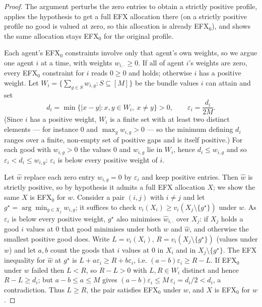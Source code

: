 \documentclass[11pt,a4paper]{article}
\theoremstyle{definition}
\theoremstyle{plain}
\newcommand{\EFX}{\textsf{EFX}}
\newcommand{\goods}{M}
\begin{document}
\begin{proof}
The argument perturbs the zero entries to obtain a strictly positive profile,
applies the hypothesis to get a full \EFX{} allocation there (on a strictly
positive profile no good is valued at zero, so this allocation is already
\EFX$_0$), and shows the same allocation stays \EFX$_0$ for the original profile.

Each agent's \EFX$_0$ constraints involve only that agent's own weights, so we
argue one agent $i$ at a time, with weights $w_{i,\cdot}\ge 0$. If all of agent
$i$'s weights are zero, every \EFX$_0$ constraint for $i$ reads $0\ge 0$ and holds;
otherwise $i$ has a positive weight. Let
$W_i=\{\sum_{g\in S}w_{i,g}:S\subseteq[\goods]\}$ be the bundle values $i$ can
attain and set
\[
  d_i=\min\{|x-y|:x,y\in W_i,\ x\neq y\}>0,\qquad
  \varepsilon_i=\frac{d_i}{2\goods}.
\]
(Since $i$ has a positive weight, $W_i$ is a finite set with at least two distinct
elements --- for instance $0$ and $\max_g w_{i,g}>0$ --- so the minimum defining
$d_i$ ranges over a finite, non-empty set of positive gaps and is itself positive.) For each good with $w_{i,g}>0$ the values $0$
and $w_{i,g}$ lie in $W_i$, hence $d_i\le w_{i,g}$ and so
$\varepsilon_i<d_i\le w_{i,g}$: $\varepsilon_i$ is below every positive weight of
$i$.

Let $\hat w$ replace each zero entry $w_{i,g}=0$ by $\varepsilon_i$ and keep
positive entries. Then $\hat w$ is strictly positive, so by hypothesis it admits a
full \EFX{} allocation $X$; we show the same $X$ is
\EFX$_0$ for $w$. Consider a pair $(i,j)$ with $i\neq j$ and let
$g^\star=\arg\min_{g\in X_j}w_{i,g}$; it suffices to check
$v_i(X_i)\ge v_i(X_j\setminus\{g^\star\})$ under $w$. As $\varepsilon_i$ is below
every positive weight, $g^\star$ also minimises $\hat w_{i,\cdot}$ over $X_j$: if
$X_j$ holds a good $i$ values at $0$ that good minimises under both $w$ and
$\hat w$, and otherwise the smallest positive good does. Write $L=v_i(X_i)$,
$R=v_i(X_j\setminus\{g^\star\})$ (values under $w$) and let $a,b$ count the
goods that $i$ values at $0$ in $X_i$ and in $X_j\setminus\{g^\star\}$. The \EFX{} inequality for
$\hat w$ at $g^\star$ is $L+a\varepsilon_i\ge R+b\varepsilon_i$, i.e.
$(a-b)\varepsilon_i\ge R-L$. If \EFX$_0$ under $w$ failed then $L<R$, so $R-L>0$
with $L,R\in W_i$ distinct and hence $R-L\ge d_i$; but $a-b\le a\le\goods$ gives
$(a-b)\varepsilon_i\le\goods\,\varepsilon_i=d_i/2<d_i$, a contradiction. Thus
$L\ge R$, the pair satisfies \EFX$_0$ under $w$, and $X$ is \EFX$_0$ for $w$.
\end{proof}
\end{document}
